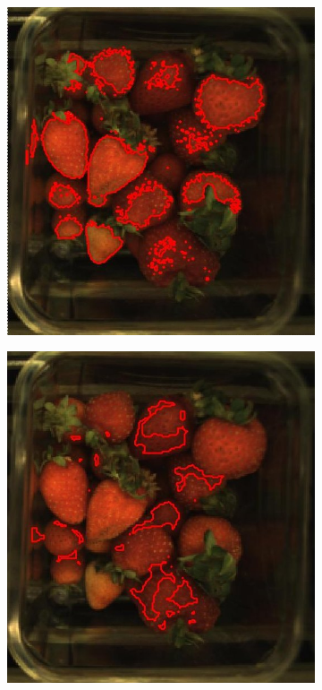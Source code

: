 \documentclass[fleqn,twoside]{article}
\begin{document}
\begin{figure}[ht]
\begin{subfigure}{.30\textwidth}
		\includegraphics[width=.9\linewidth]{over_hue.jpg}
		\caption{}
		\label{fig:over_hue}
	\end{subfigure}%
	\begin{subfigure}{.30\textwidth}
		\centering
		\includegraphics[width=.9\linewidth]{over_diff_hue.jpg}
		\caption{}
		\label{fig:over_diff}
	\end{subfigure}%


\end{figure}
\end{document}

